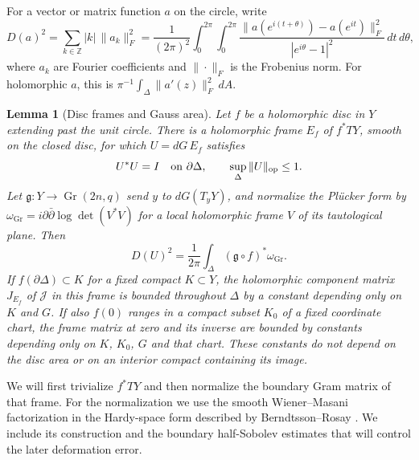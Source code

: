 \documentclass[11pt]{article}
\newtheorem{lemma}[theorem]{Lemma}
\theoremstyle{definition}
\theoremstyle{remark}
\DeclareMathOperator{\Gr}{Gr}
\numberwithin{equation}{section}
\begin{document}
For a vector or matrix function $a$ on the circle, write
\begin{equation}\label{disc:half-sobolev}
 D(a)^2=\sum_{k\in\mathbb Z}|k|\,\|a_k\|_F^2
 =\frac1{(2\pi)^2}\int_0^{2\pi}\!\int_0^{2\pi}
 \frac{\|a(e^{i(t+\theta)})-a(e^{it})\|_F^2}
 {|e^{i\theta}-1|^2}\,dt\,d\theta,
\end{equation}
where $a_k$ are Fourier coefficients and $\|\cdot\|_F$ is the
Frobenius norm.  For holomorphic $a$, this is
$\pi^{-1}\int_\Delta\|a'(z)\|_F^2\,dA$.

\begin{lemma}[Disc frames and Gauss area]\label{lem:disc-frames}
Let $f$ be a holomorphic disc in $Y$ extending past the unit circle.
There is a holomorphic frame $E_f$ of $f^*TY$, smooth on the closed
disc, for which $U=dG\,E_f$ satisfies
\begin{equation}\label{disc:frame-unitary}
 U^*U=I\quad\hbox{on }\partial\Delta,\qquad
 \sup_\Delta\|U\|_{\mathrm{op}}\le1.
\end{equation}
Let $\mathfrak g:Y\to\Gr(2n,q)$ send $y$ to $dG(T_yY)$, and
normalize the Pl\"ucker form by
$\omega_{\Gr}=i\partial\bar\partial\log\det(V^*V)$ for a local
holomorphic frame $V$ of its tautological plane.  Then
\begin{equation}\label{disc:gauss-area}
 D(U)^2=\frac1{2\pi}\int_\Delta
                          (\mathfrak g\circ f)^*\omega_{\Gr}.
\end{equation}
If $f(\partial\Delta)\subset K$ for a fixed compact $K\subset Y$,
the holomorphic component matrix $J_{E_f}$ of $\mathcal J$ in this
frame is bounded throughout $\Delta$ by a constant depending only
on $K$ and $G$.  If also $f(0)$ ranges in a compact subset $K_0$
of a fixed coordinate chart, the frame matrix at zero and its
inverse are bounded by constants depending only on $K$, $K_0$, $G$
and that chart.  These constants do not depend on the disc area or
on an interior compact containing its image.
\end{lemma}

We will first trivialize $f^*TY$ and then normalize the boundary Gram
matrix of that frame.  For the normalization we use the smooth
Wiener--Masani factorization \cite{WienerMasani1957} in the Hardy-space
form described by Berndtsson--Rosay
\cite[Theorem~2.1 and Section~6]{BerndtssonRosay}.
We include its construction and the boundary half-Sobolev estimates
that will control the later deformation error.
\end{document}
